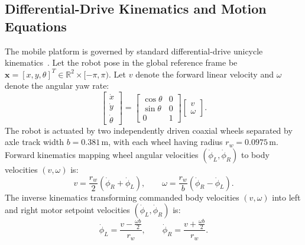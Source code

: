 \documentclass[12pt,a4paper]{article}
\begin{document}
\subsection{Differential-Drive Kinematics and Motion Equations}
The mobile platform is governed by standard differential-drive unicycle kinematics~\cite{siegwart2011}. Let the robot pose in the global reference frame be $\mathbf{x} = [x, y, \theta]^T \in \mathbb{R}^2 \times [-\pi, \pi)$. Let $v$ denote the forward linear velocity and $\omega$ denote the angular yaw rate:
\begin{equation}
\begin{bmatrix} \dot{x} \\ \dot{y} \\ \dot{\theta} \end{bmatrix} = \begin{bmatrix} \cos\theta & 0 \\ \sin\theta & 0 \\ 0 & 1 \end{bmatrix} \begin{bmatrix} v \\ \omega \end{bmatrix}.
\end{equation}
The robot is actuated by two independently driven coaxial wheels separated by axle track width $b = 0.381\,\text{m}$, with each wheel having radius $r_w = 0.0975\,\text{m}$. Forward kinematics mapping wheel angular velocities $(\dot{\phi}_L, \dot{\phi}_R)$ to body velocities $(v, \omega)$ is:
\begin{equation}
v = \frac{r_w}{2}(\dot{\phi}_R + \dot{\phi}_L), \qquad \omega = \frac{r_w}{b}(\dot{\phi}_R - \dot{\phi}_L).
\end{equation}
The inverse kinematics transforming commanded body velocities $(v, \omega)$ into left and right motor setpoint velocities $(\dot{\phi}_L, \dot{\phi}_R)$ is:
\begin{equation}
\dot{\phi}_L = \frac{v - \frac{\omega b}{2}}{r_w}, \qquad \dot{\phi}_R = \frac{v + \frac{\omega b}{2}}{r_w}.
\end{equation}
\end{document}
